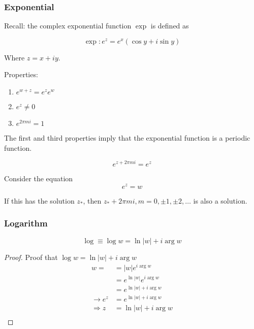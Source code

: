 \documentclass[../notes.tex]{subfiles}
\begin{document}
\subsubsection{Exponential}
Recall: the complex exponential function $ \exp $ is defined as

\begin{equation}
	\exp: e^z = e^x(\cos y + i \sin y)
\end{equation}

Where $ z = x + iy$.

Properties:

\begin{enumerate}
	\item $ e^{w+z} = e^z e^w $ 
	\item $ e^z \neq  0$ 
	\item $ e^{2\pi m i} = 1 $ 
\end{enumerate}

The first and third properties imply that the exponential function is a periodic function.

\begin{equation}
e^{z + 2 \pi m i } = e^{ z }
\end{equation}

Consider the equation
\begin{equation}
	e^z = w 
\end{equation}

If this has the solution $ z_* $, then $ z_* + 2\pi m i, m = 0, \pm 1, \pm 2, \ldots$  is also a solution.




\subsubsection{Logarithm}

\begin{definition}
\begin{equation}
	\log \equiv \log w = \ln |w| + i \arg w
\end{equation}
	
\end{definition}




\begin{proof}
Proof that $ \log w = \ln |w| + i \arg w$ 
	\begin{equation}
		\begin{split}
			w =  &= |w| e^{i \arg w} \\
			 &= e^{\ln|w|} e^{i \arg w}  \\
			 &=  e^{\ln|w| + i \arg w} \\
			 \rightarrow e^z &= e^{\ln|w| + i \arg w} \\
			 \Rightarrow z &= \ln|w| + i \arg w  \\
		\end{split}
	\end{equation}
\end{proof}
\end{document}
